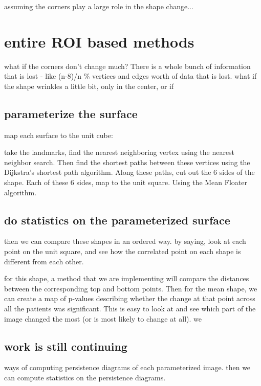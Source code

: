\documentclass[letterpaper, 12 pt, conference]{ieeeconf}  %
\begin{document}
assuming the corners play a large role in the shape change...




\section{entire ROI based methods}

what if the corners don't change much?  There is a whole bunch of information that is lost - like (n-8)/n \% vertices and edges worth of data that is lost.  what if the shape wrinkles a little bit, only in the center, or if 

\subsection{parameterize the surface}
map each surface to the unit cube:  

take the landmarks, find the nearest neighboring vertex using the nearest neighbor search.  Then find the shortest paths between these vertices using the Dijkstra's shortest path algorithm.  Along these paths, cut out the 6 sides of the shape.  Each of these 6 sides, map to the unit square.  Using the Mean Floater algorithm. 

\subsection{do statistics on the parameterized surface}

then we can compare these shapes in an ordered way.  by saying, look at each point on the unit square, and see how the correlated point on each shape is different from each other.  

for this shape, a method that we are implementing will compare the distances between the corresponding top and bottom points.  Then for the mean shape, we can create a map of p-values describing whether the change at that point across all the patients was significant.  This is easy to look at and see which part of the image changed the most (or is most likely to change at all).  we 

\subsection{work is still continuing}
ways of computing persistence diagrams of each parameterized image. then we can compute statistics on the persistence diagrams.
\end{document}
